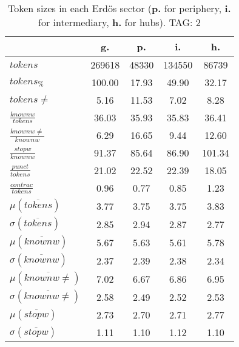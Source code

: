 \begin{table}[h!]
\begin{center}
\begin{tabular}{| l || c | c | c | c |}\hline
 & {\bf g.} & {\bf p.} & {\bf i.} & {\bf h.} \\\hline\hline
$tokens$ & 269618  & 48330  & 134550  & 86739 \\
$tokens_{\%}$ & 100.00  & 17.93  & 49.90  & 32.17 \\
$tokens \neq$ & 5.16  & 11.53  & 7.02  & 8.28 \\\hline
$\frac{knownw}{tokens}$ & 36.03  & 35.93  & 35.83  & 36.41 \\
$\frac{knownw \neq}{knownw}$ & 6.29  & 16.65  & 9.44  & 12.60 \\\hline
$\frac{stopw}{knownw}$ & 91.37  & 85.64  & 86.90  & 101.34 \\
$\frac{punct}{tokens}$ & 21.02  & 22.52  & 22.39  & 18.05 \\
$\frac{contrac}{tokens}$ & 0.96  & 0.77  & 0.85  & 1.23 \\\hline\hline
$\mu(\overline{tokens})$ & 3.77  & 3.75  & 3.75  & 3.83 \\
$\sigma(\overline{tokens})$ & 2.85  & 2.94  & 2.87  & 2.77 \\\hline
$\mu(\overline{knownw})$ & 5.67  & 5.63  & 5.61  & 5.78 \\
$\sigma(\overline{knownw})$ & 2.37  & 2.39  & 2.38  & 2.34 \\\hline
$\mu(\overline{knownw \neq})$ & 7.02  & 6.67  & 6.86  & 6.95 \\
$\sigma(\overline{knownw \neq})$ & 2.58  & 2.49  & 2.52  & 2.53 \\\hline
$\mu(\overline{stopw})$ & 2.73  & 2.70  & 2.71  & 2.77 \\
$\sigma(\overline{stopw})$ & 1.11  & 1.10  & 1.12  & 1.10 \\\hline
\end{tabular}
\caption{Token sizes in each Erd\"os sector ({{\bf p.}} for periphery, {{\bf i.}} for intermediary, {{\bf h.}} for hubs). TAG: 2}
\end{center}
\end{table}